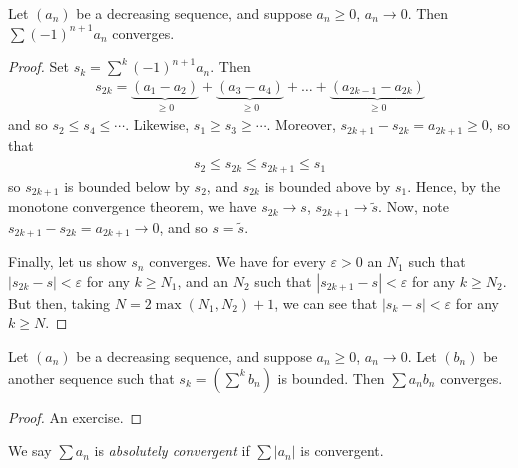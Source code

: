 \documentclass{../template/note}
\begin{document}
    
    \begin{proposition}
        Let \((a_n)\) be a decreasing sequence, and suppose \(a_n \geq 0\), \(a_n \to 0\). Then \(\sum (-1)^{n+1}a_n\) converges.
    \end{proposition}
    

    \begin{proof}
        Set \(s_k = \sum^k (-1)^{n+1} a_n\). Then
        \begin{align*}
            s_{2k} = \underbrace{(a_1 - a_2)}_{\geq 0} + \underbrace{(a_3 - a_4)}_{\geq 0} + \dots + \underbrace{(a_{2k-1} - a_{2k})}_{\geq 0}
        \end{align*}
        and so \(s_2 \leq s_4 \leq \cdots\). Likewise, \(s_1 \geq s_3 \geq \cdots\). Moreover, \(s_{2k+1} - s_{2k} = a_{2k+1} \geq 0\), so that
        \begin{align*}
            s_2 \leq s_{2k} \leq s_{2k+1} \leq s_1
        \end{align*}
        so \(s_{2k+1}\) is bounded below by \(s_2\), and \(s_{2k}\) is bounded above by \(s_1\). Hence, by the monotone convergence theorem, we have \(s_{2k} \to s\), \(s_{2k+1} \to \tilde s\). Now, note \(s_{2k+1}-s_{2k} = a_{2k+1} \to 0\), and so \(s = \tilde s\).

        Finally, let us show \(s_n\) converges. We have for every \(\varepsilon > 0\) an \(N_1\) such that \(|s_{2k}-s| < \varepsilon\) for any \(k \geq N_1\), and an \(N_2\) such that \(|s_{2k+1}-s| < \varepsilon\) for any \(k \geq N_2\). But then, taking \(N = 2\max(N_1, N_2)+1\), we can see that \(|s_k - s| < \varepsilon\) for any \(k \geq N\).
    \end{proof}
    
    \begin{proposition}
        Let \((a_n)\) be a decreasing sequence, and suppose \(a_n \geq 0\), \(a_n \to 0\). Let \((b_n)\) be another sequence such that \(s_k = (\sum^k b_n)\) is bounded. Then \(\sum a_nb_n\) converges.
    \end{proposition}
    
    \begin{proof}
        An exercise.
    \end{proof}
    
    \begin{definition}
        We say \(\sum a_n\) is \emph{absolutely convergent} if \(\sum |a_n|\) is convergent.
    \end{definition}
    
\end{document}
